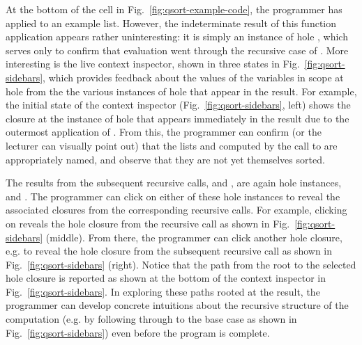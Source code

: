 At the bottom of the cell in Fig.~\ref{fig:qsort-example-code}, the programmer has applied  to an example list. However, 
the indeterminate result of this function application appears rather uninteresting: it is simply an instance of hole , which serves only to confirm that evaluation went through the recursive case of . 
More interesting is the live context inspector, shown in three states in Fig.~\ref{fig:qsort-sidebars}, which provides feedback about the values of the variables in scope at hole  from the the various instances of hole  that appear in the result. For example, the initial state of the context inspector (Fig.~\ref{fig:qsort-sidebars}, left) shows the closure at the instance of hole  that appears immediately in the result due to the outermost application of . From this, the programmer can confirm (or the lecturer can visually point out) that 
the lists  and  computed by the call to  are appropriately named, and observe that they are not yet themselves sorted.

The results from the subsequent recursive calls,  and , are again hole instances,  and . 
The programmer can click on either of these hole instances to reveal the associated closures from the corresponding recursive calls. 
For example, clicking on  reveals the hole closure from the  recursive call as shown in Fig.~\ref{fig:qsort-sidebars} (middle). 
From there, the programmer can click another hole closure, e.g.  to reveal the hole closure from the subsequent  recursive call as shown in Fig.~\ref{fig:qsort-sidebars} (right). 
Notice that the path from the root to the selected hole closure is reported as shown at the bottom of the context inspector in Fig.~\ref{fig:qsort-sidebars}. 
In exploring these paths rooted at the result, the programmer can develop concrete intuitions about the recursive structure of the computation (e.g. by following through to the base case as shown in Fig.~\ref{fig:qsort-sidebars}) even before the program is complete. 

